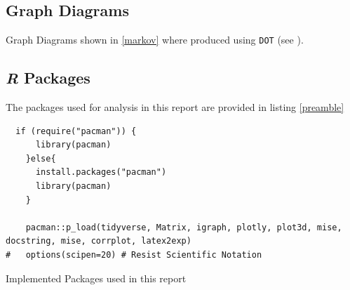 \documentclass[11pt]{report}
\begin{document}
\subsection{Graph Diagrams}
\label{sec:orgc4aeb84}
Graph Diagrams shown in \ref{markov} where produced using \texttt{DOT} (see \cite{DOTLanguage,DOTGraphDescription2020}).


\subsection{\textit{\textbf{R}} Packages}
\label{sec:orgc4aeb84}

The packages used for analysis in this report are provided in listing \ref{preamble}
\begin{listing}[htbp]
\begin{tcolorbox}
\begin{verbatim}
  if (require("pacman")) {
      library(pacman)
    }else{
      install.packages("pacman")
      library(pacman)
    }

    pacman::p_load(tidyverse, Matrix, igraph, plotly, plot3d, mise, docstring, mise, corrplot, latex2exp)
#   options(scipen=20) # Resist Scientific Notation
\end{verbatim}
\caption{\label{preamble}Implemented Packages used in this report}
\end{tcolorbox}
\end{listing}
\end{document}

